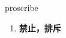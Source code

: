 
\begin{frame}
{\huge proscribe}
\begin{center}
\begin{enumerate}\Large
  \item \textbf{禁止，排斥}
\end{enumerate}
\end{center}
\end{frame}
